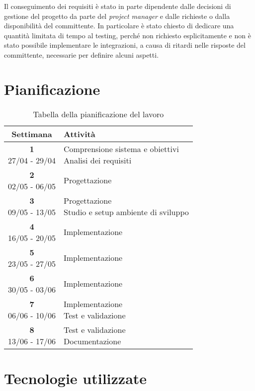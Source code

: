 \noindent Il conseguimento dei requisiti è stato in parte dipendente dalle decisioni di gestione del progetto da parte del \emph{project manager} e dalle richieste o dalla disponibilità del committente. In particolare è stato chiesto di dedicare una quantità limitata di tempo al testing, perché non richiesto esplicitamente e non è stato possibile implementare le integrazioni, a causa di ritardi nelle risposte del committente, necessarie per definire alcuni aspetti.


\section{Pianificazione}



\begin{table}[h]
	\centering
	\label{tab:pianificazione}
	\begin{tabularx}{0.7 \textwidth}{cX}
		\rowcolor{white}
		\textbf{Settimana} & \textbf{Attività} \\
		\hline
		\makecell{\textbf{1} \\ 27/04 - 29/04} & \makecell[l]{Comprensione sistema e obiettivi \\ Analisi dei requisiti} \\
		\makecell{\textbf{2} \\ 02/05 - 06/05} & Progettazione \\
		\makecell{\textbf{3} \\ 09/05 - 13/05} & \makecell[l]{Progettazione \\ Studio e setup ambiente di sviluppo} \\
		\makecell{\textbf{4} \\ 16/05 - 20/05} & Implementazione \\
		\makecell{\textbf{5} \\ 23/05 - 27/05} & Implementazione \\
		\makecell{\textbf{6} \\ 30/05 - 03/06} & Implementazione \\
		\makecell{\textbf{7} \\ 06/06 - 10/06} & \makecell[l]{Implementazione \\ Test e validazione} \\
		\makecell{\textbf{8} \\ 13/06 - 17/06} & \makecell[l]{Test e validazione \\ Documentazione}
	\end{tabularx}
	\vspace{5pt}
	\caption{Tabella della pianificazione del lavoro}
\end{table}


\section{Tecnologie utilizzate}
